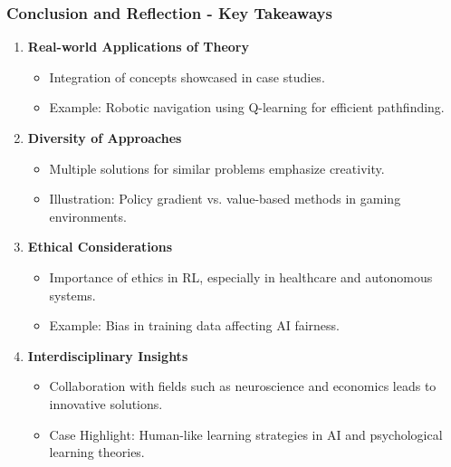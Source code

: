 \documentclass[aspectratio=169]{beamer}
\begin{document}
\begin{frame}[fragile]
    \frametitle{Conclusion and Reflection - Key Takeaways}

    \begin{enumerate}
        \item \textbf{Real-world Applications of Theory}
        \begin{itemize}
            \item Integration of concepts showcased in case studies.
            \item Example: Robotic navigation using Q-learning for efficient pathfinding.
        \end{itemize}

        \item \textbf{Diversity of Approaches}
        \begin{itemize}
            \item Multiple solutions for similar problems emphasize creativity.
            \item Illustration: Policy gradient vs. value-based methods in gaming environments.
        \end{itemize}

        \item \textbf{Ethical Considerations}
        \begin{itemize}
            \item Importance of ethics in RL, especially in healthcare and autonomous systems.
            \item Example: Bias in training data affecting AI fairness.
        \end{itemize}

        \item \textbf{Interdisciplinary Insights}
        \begin{itemize}
            \item Collaboration with fields such as neuroscience and economics leads to innovative solutions.
            \item Case Highlight: Human-like learning strategies in AI and psychological learning theories.
        \end{itemize}
    \end{enumerate}
\end{frame}
\end{document}
